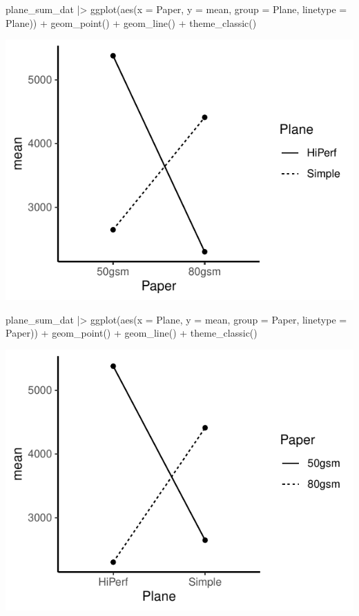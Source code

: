 \documentclass[a4paper]{article}\usepackage[]{graphicx}\usepackage[]{xcolor}
\makeatletter
\def\maxwidth{ %
  \ifdim\Gin@nat@width>\linewidth
    \linewidth
  \else
    \Gin@nat@width
  \fi
}
\makeatother
\begin{document}
\begin{minipage}[t]{0.49\textwidth}
\begin{Schunk}
\begin{Sinput}
plane_sum_dat |>
  ggplot(aes(x = Paper, y = mean,
             group = Plane, 
             linetype = Plane)) + 
  geom_point() +
  geom_line() + 
  theme_classic()
\end{Sinput}


{\centering \includegraphics[width=\maxwidth]{figure/listings-unnamed-chunk-322-1} 

}

\end{Schunk}
\end{minipage}
\hspace{0.02\textwidth}
\begin{minipage}[t]{0.49\textwidth}
\begin{Schunk}
\begin{Sinput}
plane_sum_dat |> 
  ggplot(aes(x = Plane, y = mean,
             group = Paper, 
             linetype = Paper)) + 
  geom_point() +
  geom_line() + 
  theme_classic()
\end{Sinput}


{\centering \includegraphics[width=\maxwidth]{figure/listings-unnamed-chunk-323-1} 

}

\end{Schunk}
\end{minipage}
\end{document}
